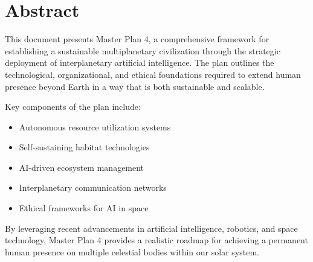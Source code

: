 \chapter*{Abstract}

This document presents Master Plan 4, a comprehensive framework for establishing a sustainable multiplanetary civilization through the strategic deployment of interplanetary artificial intelligence. The plan outlines the technological, organizational, and ethical foundations required to extend human presence beyond Earth in a way that is both sustainable and scalable.

Key components of the plan include:
\begin{itemize}
    \item Autonomous resource utilization systems
    \item Self-sustaining habitat technologies
    \item AI-driven ecosystem management
    \item Interplanetary communication networks
    \item Ethical frameworks for AI in space
\end{itemize}

By leveraging recent advancements in artificial intelligence, robotics, and space technology, Master Plan 4 provides a realistic roadmap for achieving a permanent human presence on multiple celestial bodies within our solar system.
